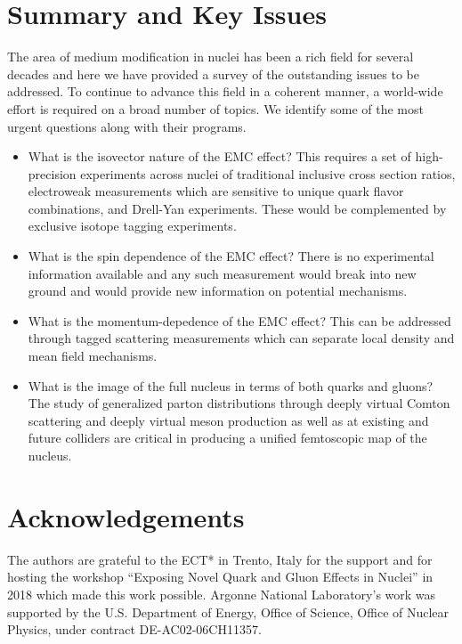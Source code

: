 \section{Summary and Key Issues}

The area of medium modification in nuclei has been a rich field for several decades and here we have provided a survey of the outstanding issues to be addressed.  To continue to advance this field in a coherent manner, a world-wide effort is required on a broad number of topics.  We identify some of the most urgent questions along with their programs.

\begin{itemize}
    \item{What is the isovector nature of the EMC effect?  This requires a set of high-precision experiments across nuclei of traditional inclusive cross section ratios, electroweak measurements which are sensitive to unique quark flavor combinations, and Drell-Yan experiments.  These would be complemented by exclusive isotope tagging experiments.}
    \item{What is the spin dependence of the EMC effect?  There is no experimental information available and any such measurement would break into new ground and would provide new information on potential mechanisms.}
    \item{What is the momentum-depedence of the EMC effect?  This can be addressed through tagged scattering measurements which can separate local density and mean field mechanisms.}
    \item{What is the image of the full nucleus in terms of both quarks and gluons?  The study of generalized parton distributions through deeply virtual Comton scattering and deeply virtual meson production as well as at existing and future colliders are critical in producing a unified femtoscopic map of the nucleus.}
\end{itemize}

\section{Acknowledgements}

The authors are grateful to the ECT* in Trento, Italy for the support and for hosting the workshop ``Exposing Novel Quark and Gluon Effects in Nuclei'' in 2018 which made this work possible.  Argonne National Laboratory's work was supported by the U.S. Department of Energy, Office of Science, Office of Nuclear Physics, under contract DE-AC02-06CH11357.  

